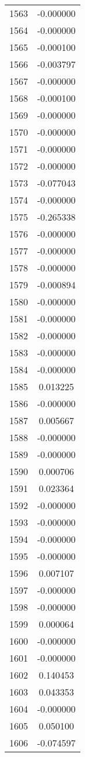 \documentclass[12pt]{article}
\begin{document}
\begin{longtable}{@{}cc@{}}
1563 & -0.000000 \\
1564 & -0.000000 \\
1565 & -0.000100 \\
1566 & -0.003797 \\
1567 & -0.000000 \\
1568 & -0.000100 \\
1569 & -0.000000 \\
1570 & -0.000000 \\
1571 & -0.000000 \\
1572 & -0.000000 \\
1573 & -0.077043 \\
1574 & -0.000000 \\
1575 & -0.265338 \\
1576 & -0.000000 \\
1577 & -0.000000 \\
1578 & -0.000000 \\
1579 & -0.000894 \\
1580 & -0.000000 \\
1581 & -0.000000 \\
1582 & -0.000000 \\
1583 & -0.000000 \\
1584 & -0.000000 \\
1585 & 0.013225 \\
1586 & -0.000000 \\
1587 & 0.005667 \\
1588 & -0.000000 \\
1589 & -0.000000 \\
1590 & 0.000706 \\
1591 & 0.023364 \\
1592 & -0.000000 \\
1593 & -0.000000 \\
1594 & -0.000000 \\
1595 & -0.000000 \\
1596 & 0.007107 \\
1597 & -0.000000 \\
1598 & -0.000000 \\
1599 & 0.000064 \\
1600 & -0.000000 \\
1601 & -0.000000 \\
1602 & 0.140453 \\
1603 & 0.043353 \\
1604 & -0.000000 \\
1605 & 0.050100 \\
1606 & -0.074597 \\

\end{longtable}
\end{document}
